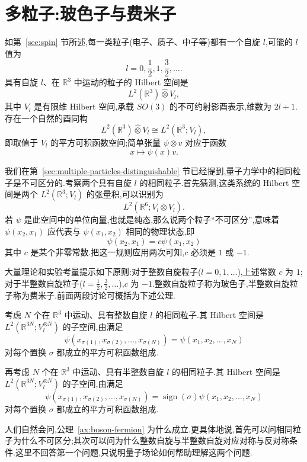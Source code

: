 \section{多粒子:玻色子与费米子}
\label{sec:multiple-particles-identical}

如第~\ref{sec:spin} 节所述,每一类粒子(电子、质子、中子等)都有一个自旋 $l$,可能的 $l$ 值为
\[
 l=0,\frac12,1,\frac32,\ldots.
\]
具有自旋 $l$、在 $\mathbb R^3$ 中运动的粒子的 Hilbert 空间是
\[
 L^2(\mathbb R^3)\widehat\otimes V_l,
\]
其中 $V_l$ 是有限维 Hilbert 空间,承载 $SO(3)$ 的不可约射影酉表示,维数为 $2l+1$.存在一个自然的酉同构
\[
 L^2(\mathbb R^3)\widehat\otimes V_l
 \cong L^2(\mathbb R^3;V_l),
\]
即取值于 $V_l$ 的平方可积函数空间;简单张量 $\psi\otimes v$ 对应于函数
\[
 x\longmapsto\psi(x)v.
\]

我们在第~\ref{sec:multiple-particles-distinguishable} 节已经提到,量子力学中的相同粒子是不可区分的.考察两个具有自旋 $l$ 的相同粒子.首先猜测,这类系统的 Hilbert 空间是两个 $L^2(\mathbb R^3;V_l)$ 的张量积,可以识别为
\[
 L^2(\mathbb R^6;V_l\otimes V_l).
\]
若 $\psi$ 是此空间中的单位向量,也就是纯态,那么说两个粒子“不可区分”,意味着 $\psi(x_2,x_1)$ 应代表与 $\psi(x_1,x_2)$ 相同的物理状态,即
\[
 \psi(x_2,x_1)=c\psi(x_1,x_2)
\]
其中 $c$ 是某个非零常数.把这一规则应用两次可知,$c$ 必须是 $1$ 或 $-1$.

大量理论和实验考量提示如下原则:对于整数自旋粒子($l=0,1,\ldots$),上述常数 $c$ 为 $1$;对于半整数自旋粒子($l=\frac12,\frac32,\ldots$),$c$ 为 $-1$.整数自旋粒子称为玻色子,半整数自旋粒子称为费米子.前面两段讨论可概括为下述公理.

\begin{axiom}[相同粒子的对称性与反对称性]\label{ax:boson-fermion}
考虑 $N$ 个在 $\mathbb R^3$ 中运动、具有整数自旋 $l$ 的相同粒子.其 Hilbert 空间是 $L^2(\mathbb R^{3N};V_l^{\otimes N})$ 的子空间,由满足
\[
 \psi(x_{\sigma(1)},x_{\sigma(2)},\ldots,x_{\sigma(N)})
 =\psi(x_1,x_2,\ldots,x_N)
\]
对每个置换 $\sigma$ 都成立的平方可积函数组成.

再考虑 $N$ 个在 $\mathbb R^3$ 中运动、具有半整数自旋 $l$ 的相同粒子.其 Hilbert 空间是 $L^2(\mathbb R^{3N};V_l^{\otimes N})$ 的子空间,由满足
\[
 \psi(x_{\sigma(1)},x_{\sigma(2)},\ldots,x_{\sigma(N)})
 =\operatorname{sign}(\sigma)\psi(x_1,x_2,\ldots,x_N)
\]
对每个置换 $\sigma$ 都成立的平方可积函数组成.
\end{axiom}

人们自然会问,公理~\ref{ax:boson-fermion} 为什么成立.更具体地说,首先可以问相同粒子为什么不可区分;其次可以问为什么整数自旋与半整数自旋对应对称与反对称条件.这里不回答第一个问题,只说明量子场论如何帮助理解这两个问题.

